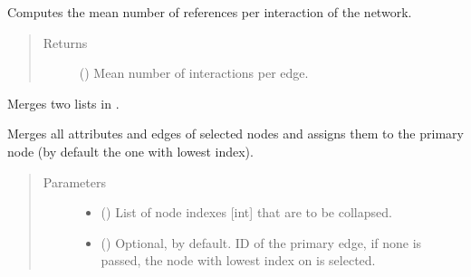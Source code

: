 \documentclass[letterpaper,10pt,english]{sphinxmanual}
\begin{document}
\begin{fulllineitems}
\begin{fulllineitems}
\label{\detokenize{main:pypath.main.PyPath.mean_reference_per_interaction}}
Computes the mean number of references per interaction of the
network.
\begin{quote}\begin{description}
\item[{Returns}] \leavevmode
() \textendash{} Mean number of interactions per edge.

\end{description}\end{quote}

\end{fulllineitems}


\begin{fulllineitems}
\label{\detokenize{main:pypath.main.PyPath.merge_lists}}
Merges two lists in .

\end{fulllineitems}


\begin{fulllineitems}
\label{\detokenize{main:pypath.main.PyPath.merge_nodes}}
Merges all attributes and edges of selected nodes and assigns
them to the primary node (by default the one with lowest index).
\begin{quote}\begin{description}
\item[{Parameters}] \leavevmode\begin{itemize}
\item {} 
 () \textendash{} List of node indexes {[}int{]} that are to be collapsed.

\item {} 
 () \textendash{} Optional,  by default. ID of the primary edge, if
none is passed, the node with lowest index on  is
selected.


\end{itemize}
\end{description}
\end{quote}
\end{fulllineitems}
\end{fulllineitems}
\end{document}
